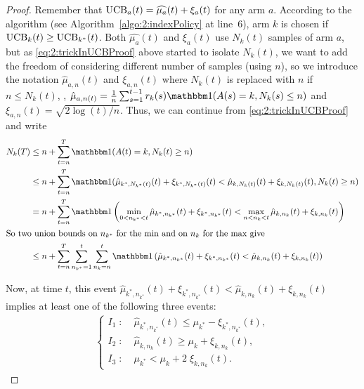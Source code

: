 \begin{proof}
    Remember that $\mathrm{UCB}_a(t) = \widehat{\mu_a}(t) + \xi_a(t)$ for any arm $a$.
    According to the algorithm (see Algorithm~\ref{algo:2:indexPolicy} at line~6),
    arm $k$ is chosen if $\mathrm{UCB}_k(t) \geq \mathrm{UCB}_{k^*}(t)$.
    Both $\widehat{\mu_a}(t)$ and $\xi_a(t)$ use $N_k(t)$ samples of arm $a$,
    but as \eqref{eq:2:trickInUCBProof} above started to isolate $N_k(t)$, we want to add the freedom of considering different number of samples (using $n$), so we introduce the notation
    $\hat{\mu}_{a,n}(t)$ and $\xi_{a,n}(t)$ where $N_k(t)$ is replaced with $n$ if $n \leq N_k(t)$,
    \ie, $\hat{\mu}_{a,n(t)} = \frac{1}{n} \sum_{s=1}^{t-1} r_k(s) \indic(A(s)=k, N_k(s) \leq n)$ and $\xi_{a,n}(t) = \sqrt{2\log(t) / n}$.
    Thus, we can continue from \eqref{eq:2:trickInUCBProof} and write
    \begin{align}\label{eq:2:decompositionInUCBProof}
        N_k(T) & \leq n + \sum_{t=n}^T \indic(A(t) = k, N_k(t) \geq n) \nonumber \\
        & \leq n + \sum_{t=n}^T \indic(\hat{\mu}_{k^*,N_{k^*}(t)}(t) + \xi_{k^*,N_{k^*}(t)}(t) < \hat{\mu}_{k,N_k(t)}(t) + \xi_{k,N_k(t)}(t), N_k(t) \geq n)  \nonumber \\
        & = n + \sum_{t=n}^T \indic\left(\min_{0 < n_{k^*} < t} \hat{\mu}_{k^*,n_{k^*}}(t) + \xi_{k^*,n_{k^*}}(t) < \max_{n < n_k < t} \hat{\mu}_{k,n_k}(t) + \xi_{k,n_k}(t) \right) \nonumber \\
        \intertext{So two union bounds on $n_{k^*}$ for the $\min$ and on $n_k$ for the $\max$ give}
        & \leq n + \sum_{t=n}^T \sum_{n_{k^*}=1}^t \sum_{n_{k}=n}^t  \indic\left( \hat{\mu}_{k^*,n_{k^*}}(t) + \xi_{k^*,n_{k^*}}(t) < \hat{\mu}_{k,n_k}(t) + \xi_{k,n_k}(t) \right)
    \end{align}

    Now, at time $t$, this event $\hat{\mu}_{k^*,n_{k^*}}(t) + \xi_{k^*,n_{k^*}}(t) < \hat{\mu}_{k,n_k}(t) + \xi_{k,n_k}(t)$
    implies at least one of the following three events:
    \begin{align*}
        \begin{cases}
        I_1 \;:\; & \hat{\mu}_{k^*,n_{k^*}}(t) \leq \mu_{k^*} - \xi_{k^*,n_{k^*}}(t), \\
        I_2 \;:\; & \hat{\mu}_{k,n_k}(t) \geq \mu_k + \xi_{k,n_k}(t), \\
        I_3 \;:\; & \mu_{k^*} < \mu_k + 2 \; \xi_{k,n_k}(t).
        \end{cases}
    \end{align*}


\end{proof}
